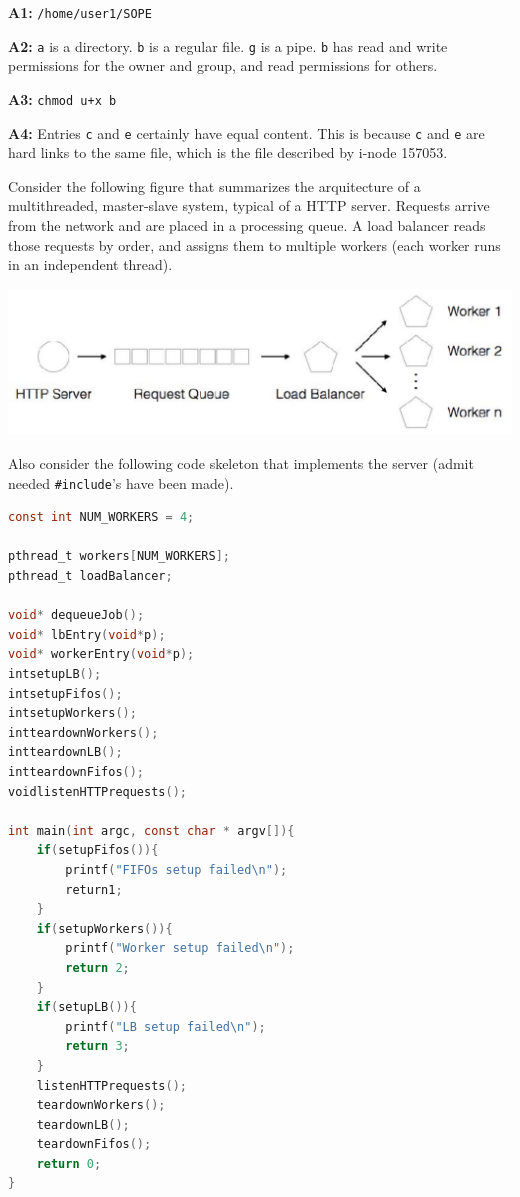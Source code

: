 \documentclass{sope}
\begin{document}
\ansseparator

\textbf{A1:} \texttt{/home/user1/SOPE}

\textbf{A2:} \texttt{a} is a directory. \texttt{b} is a regular file. \texttt{g} is a pipe. \texttt{b} has read and write permissions for the owner and group, and read permissions for others.

\textbf{A3:} \texttt{chmod u+x b}

\textbf{A4:} Entries \texttt{c} and \texttt{e} certainly have equal content. This is because \texttt{c} and \texttt{e} are hard links to the same file, which is the file described by i-node 157053.

Consider the following figure that summarizes the arquitecture of a multithreaded, master-slave system, typical of a HTTP server. Requests arrive from the network and are placed in a processing queue. A load balancer reads those requests by order, and assigns them to multiple workers (each worker runs in an independent thread).

\begin{center}
    \includegraphics[scale=0.2]{2016N-2}
\end{center}

Also consider the following code skeleton that implements the server (admit needed \texttt{\#include}'s have been made).

\begin{lstlisting}[language=C]
const int NUM_WORKERS = 4;

pthread_t workers[NUM_WORKERS];
pthread_t loadBalancer;

void* dequeueJob();
void* lbEntry(void*p);
void* workerEntry(void*p);
intsetupLB();
intsetupFifos();
intsetupWorkers();
intteardownWorkers();
intteardownLB();
intteardownFifos();
voidlistenHTTPrequests();

int main(int argc, const char * argv[]){
    if(setupFifos()){
        printf("FIFOs setup failed\n");
        return1;
    }
    if(setupWorkers()){
        printf("Worker setup failed\n");
        return 2;
    }
    if(setupLB()){
        printf("LB setup failed\n");
        return 3;
    }
    listenHTTPrequests();
    teardownWorkers();
    teardownLB();
    teardownFifos();
    return 0;
}
\end{lstlisting}
\end{document}
